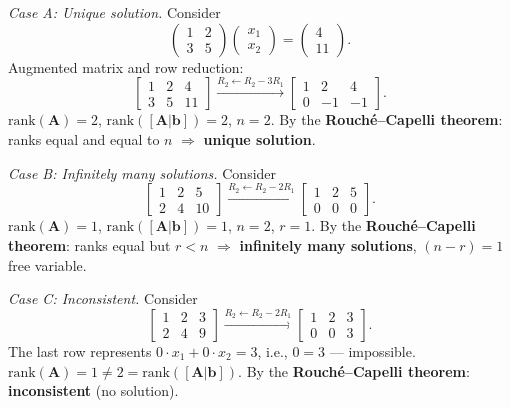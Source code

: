 \documentclass[12pt,a4paper]{article}
\begin{document}
\textit{Case A: Unique solution.} Consider
\[
\begin{pmatrix} 1 & 2 \\ 3 & 5 \end{pmatrix}
\begin{pmatrix} x_1 \\ x_2 \end{pmatrix}
=
\begin{pmatrix} 4 \\ 11 \end{pmatrix}.
\]
Augmented matrix and row reduction:
\[
\left[\begin{array}{cc|c} 1 & 2 & 4 \\ 3 & 5 & 11 \end{array}\right]
\xrightarrow{R_2 \leftarrow R_2 - 3R_1}
\left[\begin{array}{cc|c} 1 & 2 & 4 \\ 0 & -1 & -1 \end{array}\right].
\]
$\text{rank}(\mathbf{A}) = 2$, $\text{rank}([\mathbf{A}|\mathbf{b}]) = 2$, $n = 2$.
By the \textbf{Rouch\'{e}--Capelli theorem}: ranks equal and equal to $n$ $\Rightarrow$ \textbf{unique solution}.

\textit{Case B: Infinitely many solutions.} Consider
\[
\left[\begin{array}{cc|c} 1 & 2 & 5 \\ 2 & 4 & 10 \end{array}\right]
\xrightarrow{R_2 \leftarrow R_2 - 2R_1}
\left[\begin{array}{cc|c} 1 & 2 & 5 \\ 0 & 0 & 0 \end{array}\right].
\]
$\text{rank}(\mathbf{A}) = 1$, $\text{rank}([\mathbf{A}|\mathbf{b}]) = 1$, $n = 2$, $r = 1$.
By the \textbf{Rouch\'{e}--Capelli theorem}: ranks equal but $r < n$ $\Rightarrow$ \textbf{infinitely many solutions},
$(n - r) = 1$ free variable.

\textit{Case C: Inconsistent.} Consider
\[
\left[\begin{array}{cc|c} 1 & 2 & 3 \\ 2 & 4 & 9 \end{array}\right]
\xrightarrow{R_2 \leftarrow R_2 - 2R_1}
\left[\begin{array}{cc|c} 1 & 2 & 3 \\ 0 & 0 & 3 \end{array}\right].
\]
The last row represents $0 \cdot x_1 + 0 \cdot x_2 = 3$, i.e., $0 = 3$ --- impossible.
$\text{rank}(\mathbf{A}) = 1 \neq 2 = \text{rank}([\mathbf{A}|\mathbf{b}])$.
By the \textbf{Rouch\'{e}--Capelli theorem}: \textbf{inconsistent} (no solution).
\end{document}
